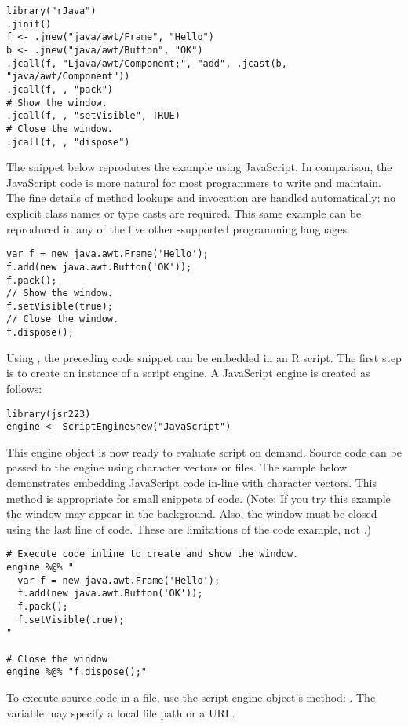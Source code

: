 \begin{verbatim}
library("rJava")
.jinit()
f <- .jnew("java/awt/Frame", "Hello")
b <- .jnew("java/awt/Button", "OK")
.jcall(f, "Ljava/awt/Component;", "add", .jcast(b, "java/awt/Component"))
.jcall(f, , "pack")
# Show the window.
.jcall(f, , "setVisible", TRUE)
# Close the window.
.jcall(f, , "dispose")
\end{verbatim}

The snippet below reproduces the  example using JavaScript. In comparison, the JavaScript code is more natural for most programmers to write and maintain. The fine details of method lookups and invocation are handled automatically: no explicit class names or type casts are required. This same example can be reproduced in any of the five other -supported programming languages.

\begin{verbatim}
var f = new java.awt.Frame('Hello');
f.add(new java.awt.Button('OK'));
f.pack();
// Show the window.
f.setVisible(true);
// Close the window.
f.dispose();
\end{verbatim}

Using , the preceding code snippet can be embedded in an R script. The first step is to create an instance of a script engine. A JavaScript engine is created as follows:

\begin{verbatim}
library(jsr223)
engine <- ScriptEngine$new("JavaScript")
\end{verbatim}
This engine object is now ready to evaluate script on demand. Source code can be passed to the engine using character vectors or files. The sample below demonstrates embedding JavaScript code in-line with character vectors. This method is appropriate for small snippets of code. (Note: If you try this example the window may appear in the background. Also, the window must be closed using the last line of code. These are limitations of the code example, not .)

\begin{verbatim}
# Execute code inline to create and show the window.
engine %@% "
  var f = new java.awt.Frame('Hello');
  f.add(new java.awt.Button('OK'));
  f.pack();
  f.setVisible(true);
"

# Close the window
engine %@% "f.dispose();"
\end{verbatim}
To execute source code in a file, use the script engine object's  method: . The variable  may specify a local file path or a URL. %

